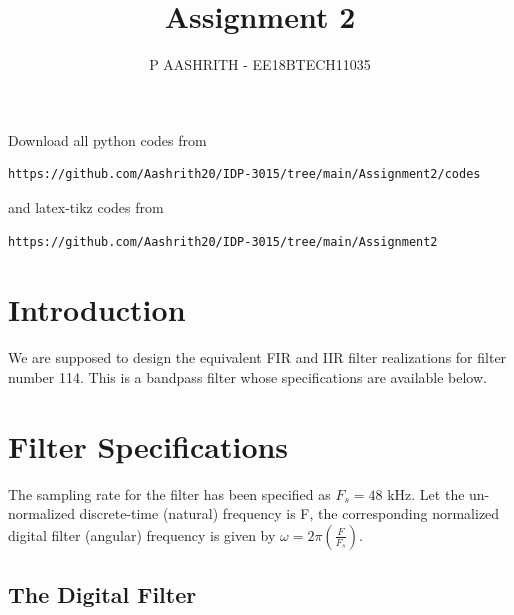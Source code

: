 \documentclass[journal,12pt,twocolumn]{IEEEtran}
\begin{document}
\def\putbox#1#2#3{\makebox[0in][l]{\makebox[#1][l]{}\raisebox{\baselineskip}[0in][0in]{\raisebox{#2}[0in][0in]{#3}}}}
     \def\rightbox#1{\makebox[0in][r]{#1}}
     \def\centbox#1{\makebox[0in]{#1}}
     \def\topbox#1{\raisebox{-\baselineskip}[0in][0in]{#1}}
     \def\midbox#1{\raisebox{-0.5\baselineskip}[0in][0in]{#1}}
\vspace{3cm}
\title{Assignment 2}
\author{P AASHRITH - EE18BTECH11035}
\maketitle
\newpage
\bigskip
\renewcommand{\thefigure}{\theenumi}
\renewcommand{\thetable}{\theenumi}
Download all python codes from 
\begin{lstlisting}
https://github.com/Aashrith20/IDP-3015/tree/main/Assignment2/codes
\end{lstlisting}
%
and latex-tikz codes from 
%
\begin{lstlisting}
https://github.com/Aashrith20/IDP-3015/tree/main/Assignment2
\end{lstlisting}
\section{Introduction}
We are supposed to design the equivalent FIR and IIR filter realizations for filter number 114.  
This is a bandpass filter whose specifications are available below.
\section{Filter Specifications}
The sampling rate for the filter has been specified as $F_s =  48$ kHz. Let the un-normalized  discrete-time (natural) frequency is F, the corresponding normalized digital filter (angular) frequency is given by $\omega = 2\pi
\left(\frac{F}{F_s}\right)$.

\subsection{The Digital Filter}
\end{document}
